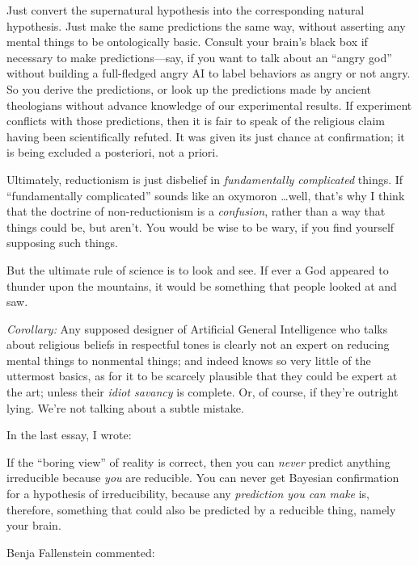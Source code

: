 {
 Just convert the supernatural hypothesis into the corresponding
natural hypothesis. Just make the same predictions the same way,
without asserting any mental things to be ontologically basic. Consult
your brain's black box if necessary to make
predictions---say, if you want to talk about an
``angry god'' without building a
full-fledged angry AI to label behaviors as angry or not angry. So you
derive the predictions, or look up the predictions made by ancient
theologians without advance knowledge of our experimental results. If
experiment conflicts with those predictions, then it is fair to speak
of the religious claim having been scientifically refuted. It was given
its just chance at confirmation; it is being excluded a posteriori, not
a priori.}

{
 Ultimately, reductionism is just disbelief in
\textit{fundamentally complicated} things. If
``fundamentally complicated'' sounds
like an oxymoron \ldots well, that's why I think that
the doctrine of non-reductionism is a \textit{confusion}, rather than a
way that things could be, but aren't. You would be wise
to be wary, if you find yourself supposing such things.}

{
 But the ultimate rule of science is to look and see. If ever a God
appeared to thunder upon the mountains, it would be something that
people looked at and saw.}

{
 \textit{Corollary:} Any supposed designer of Artificial General
Intelligence who talks about religious beliefs in respectful tones is
clearly not an expert on reducing mental things to nonmental things;
and indeed knows so very little of the uttermost basics, as for it to
be scarcely plausible that they could be expert at the art; unless
their \textit{idiot savancy} is complete. Or, of course, if
they're outright lying. We're not
talking about a subtle mistake.}

\myendsectiontext


{
 In the last essay, I wrote:}

{
 If the ``boring view'' of
reality is correct, then you can \textit{never} predict anything
irreducible because \textit{you} are reducible. You can never get
Bayesian confirmation for a hypothesis of irreducibility, because any
\textit{prediction you can make} is, therefore, something that could
also be predicted by a reducible thing, namely your brain.}

{
 Benja Fallenstein commented:}

